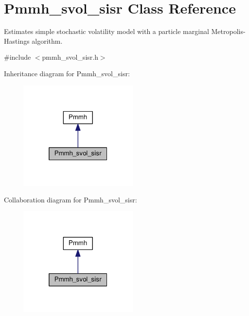 \hypertarget{classPmmh__svol__sisr}{}\section{Pmmh\+\_\+svol\+\_\+sisr Class Reference}
\label{classPmmh__svol__sisr}


Estimates simple stochastic volatility model with a particle marginal Metropolis-\/\+Hastings algorithm.  




{\ttfamily \#include $<$pmmh\+\_\+svol\+\_\+sisr.\+h$>$}



Inheritance diagram for Pmmh\+\_\+svol\+\_\+sisr\+:\nopagebreak
\begin{figure}[H]
\begin{center}
\leavevmode
\includegraphics[width=169pt]{classPmmh__svol__sisr__inherit__graph}
\end{center}
\end{figure}


Collaboration diagram for Pmmh\+\_\+svol\+\_\+sisr\+:\nopagebreak
\begin{figure}[H]
\begin{center}
\leavevmode
\includegraphics[width=169pt]{classPmmh__svol__sisr__coll__graph}
\end{center}
\end{figure}
